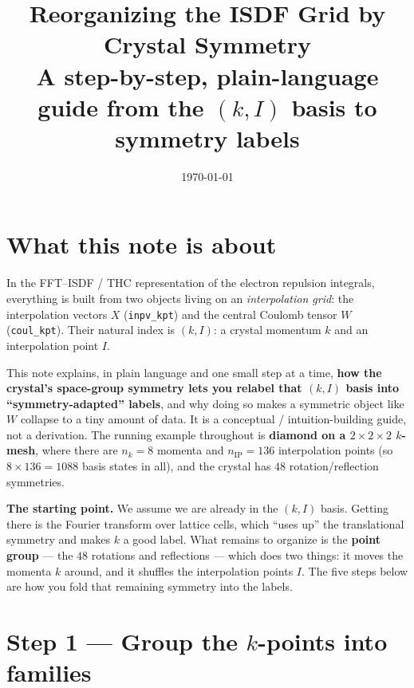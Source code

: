 \documentclass[11pt]{article}
\title{\vspace{-1.2cm}Reorganizing the ISDF Grid by Crystal Symmetry\\[2pt]
\large A step-by-step, plain-language guide from the $(k,I)$ basis to symmetry labels}
\author{}
\date{\today}
\begin{document}
\maketitle
\vspace{-1.0cm}

\section*{What this note is about}

In the FFT--ISDF / THC representation of the electron repulsion integrals, everything is built from
two objects living on an \emph{interpolation grid}: the interpolation vectors $X$ (\texttt{inpv\_kpt})
and the central Coulomb tensor $W$ (\texttt{coul\_kpt}). Their natural index is $(k,I)$: a crystal
momentum $k$ and an interpolation point $I$.

This note explains, in plain language and one small step at a time, \textbf{how the crystal's
space-group symmetry lets you relabel that $(k,I)$ basis into ``symmetry-adapted'' labels}, and why
doing so makes a symmetric object like $W$ collapse to a tiny amount of data. It is a conceptual /
intuition-building guide, not a derivation. The running example throughout is \textbf{diamond on a
$2\times2\times2$ $k$-mesh}, where there are $n_k=8$ momenta and $n_{\mathrm{IP}}=136$ interpolation
points (so $8\times136=1088$ basis states in all), and the crystal has $48$ rotation/reflection
symmetries.

\textbf{The starting point.} We assume we are already in the $(k,I)$ basis. Getting there is the
Fourier transform over lattice cells, which ``uses up'' the translational symmetry and makes $k$ a
good label. What remains to organize is the \textbf{point group} --- the $48$ rotations and
reflections --- which does two things: it moves the momenta $k$ around, and it shuffles the
interpolation points $I$. The five steps below are how you fold that remaining symmetry into the
labels.

\section*{Step 1 --- Group the $k$-points into families}
\end{document}
